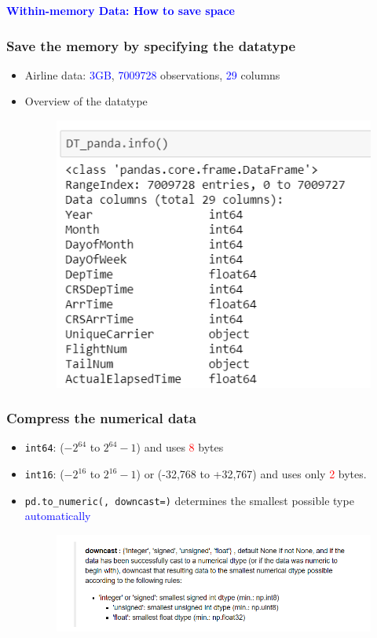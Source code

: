 \documentclass[red]{beamer}
\begin{document}
\begin{frame}
\centering
\LARGE \textcolor{blue}{\textbf{Within-memory Data: How to save space}}
\end{frame}

\begin{frame}
\frametitle{Save the memory by specifying the datatype}
\begin{itemize}
	\item Airline data: \textcolor{blue}{3GB}, \textcolor{blue}{7009728} observations, \textcolor{blue}{29} columns
	\item Overview of the datatype
	\begin{figure}
		\centering
		\includegraphics[width=0.6\linewidth]{figure/screenshot010}
	\end{figure}
\end{itemize}
\end{frame}

\begin{frame}
\frametitle{Compress the numerical data}
	\begin{itemize}
		\item \texttt{int64}: ($-2^{64}$ to $2^{64}-1$) and uses \textcolor{red}{8} bytes
		\vspace{2mm}
		
		\item \texttt{int16}:  ($-2^{16}$ to $2^{16}-1$) or (-32,768 to +32,767) and uses only \textcolor{red}{2} bytes. 
		
		\vspace{2mm}
		\item \texttt{pd.to\_numeric(, downcast=)} determines the smallest possible type \textcolor{blue}{automatically}
		\begin{figure}
			\centering
			\includegraphics[width=1\linewidth]{figure/screenshot011}
		\end{figure}
		
	\end{itemize}
\end{frame}
\end{document}
